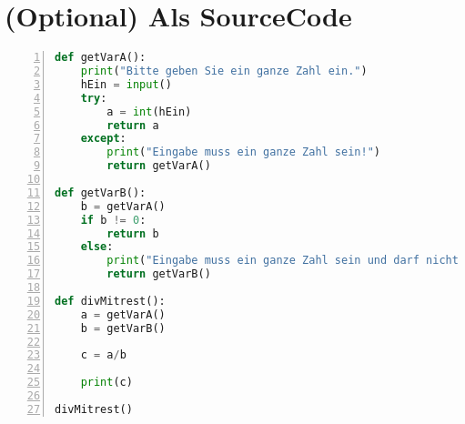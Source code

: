 \documentclass[12pt]{article}
\begin{document}
\section*{(Optional) Als SourceCode}
\begin{lstlisting}[caption={Umsetzung des obigen Flussdiagramm/Programmablaufsplan in Python},language=Python,frame=single, numbers=left, breaklines=true]
def getVarA():
    print("Bitte geben Sie ein ganze Zahl ein.")
    hEin = input()
    try:
        a = int(hEin)
        return a
    except:
        print("Eingabe muss ein ganze Zahl sein!")
        return getVarA()

def getVarB():
    b = getVarA()
    if b != 0:
        return b
    else:
        print("Eingabe muss ein ganze Zahl sein und darf nicht 0 sein!")
        return getVarB()

def divMitrest():
    a = getVarA()
    b = getVarB()

    c = a/b

    print(c)

divMitrest()
\end{lstlisting}
\end{document}
